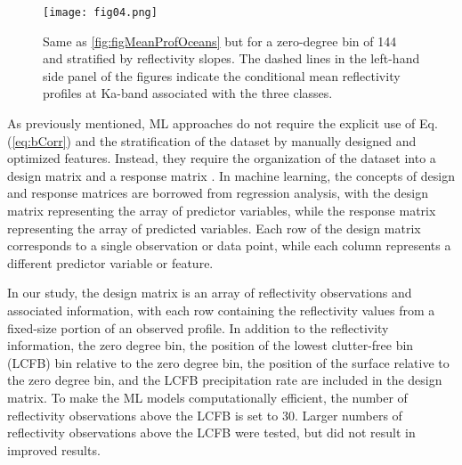 \documentclass{ametsocV6.1} %
\begin{document}

\begin{figure}[h]
    \centering
    \texttt{[image: fig04.png]}
    \caption{Same as \ref{fig:figMeanProfOceans} but for a zero-degree bin of 144 and stratified by reflectivity slopes. The dashed lines in the left-hand side panel of the figures indicate the conditional mean reflectivity profiles at Ka-band associated with the three classes.}
    \label{fig:figMeanProfOceans_strat}
\end{figure}


As previously mentioned, ML approaches do not require the explicit use of Eq. (\ref{eq:bCorr}) and the stratification of the dataset by manually designed and optimized features. Instead, they require the organization of the dataset into a design matrix and a response matrix \citep{bishop2006}. In machine learning, the concepts of design and response matrices are borrowed from regression analysis, with the design matrix representing the array of predictor variables, while the response matrix representing the array of predicted variables. Each row of the design matrix corresponds to a single observation or data point, while each column represents a different predictor variable or feature.

In our study, the design matrix is an array of reflectivity observations and associated information, with each row containing the reflectivity values from a fixed-size portion of an observed profile. In addition to the reflectivity information, the zero degree bin, the position of the lowest clutter-free bin (LCFB) bin relative to the zero degree bin, the position of the surface relative to the zero degree bin, and the LCFB precipitation rate are included in the design matrix. To make the ML models computationally efficient, the number of reflectivity observations above the LCFB is set to 30. Larger numbers of reflectivity observations above the LCFB were tested, but did not result in improved results.
\end{document}
